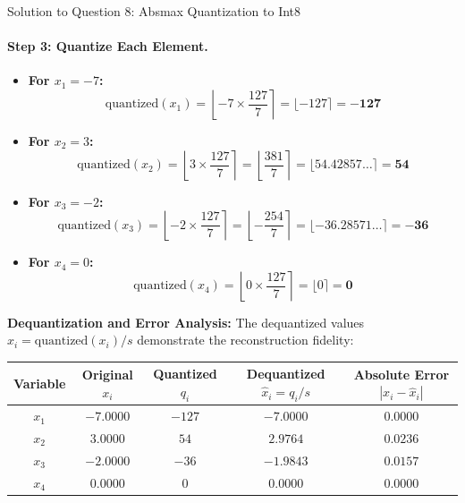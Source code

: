 \documentclass[11pt,a4paper]{article}
\begin{document}
\begin{solutionbox}{Solution to Question 8: Absmax Quantization to Int8}
\paragraph{Step 3: Quantize Each Element.}
\begin{itemize}[leftmargin=2em]
    \item \textbf{For $x_1 = -7$:}
    \begin{equation}
        \text{quantized}(x_1) = \left\lfloor -7 \times \frac{127}{7} \right\rceil = \lfloor -127 \rceil = \mathbf{-127}
    \end{equation}
    \item \textbf{For $x_2 = 3$:}
    \begin{equation}
        \text{quantized}(x_2) = \left\lfloor 3 \times \frac{127}{7} \right\rceil = \left\lfloor \frac{381}{7} \right\rceil = \lfloor 54.42857 \dots \rceil = \mathbf{54}
    \end{equation}
    \item \textbf{For $x_3 = -2$:}
    \begin{equation}
        \text{quantized}(x_3) = \left\lfloor -2 \times \frac{127}{7} \right\rceil = \left\lfloor -\frac{254}{7} \right\rceil = \lfloor -36.28571 \dots \rceil = \mathbf{-36}
    \end{equation}
    \item \textbf{For $x_4 = 0$:}
    \begin{equation}
        \text{quantized}(x_4) = \left\lfloor 0 \times \frac{127}{7} \right\rceil = \lfloor 0 \rceil = \mathbf{0}
    \end{equation}
\end{itemize}

\medskip
\textbf{Dequantization and Error Analysis:}
The dequantized values $\hat{x}_i = \text{quantized}(x_i) / s$ demonstrate the reconstruction fidelity:
\begin{center}
\small
\begin{tabular}{ccccc}
\toprule
\textbf{Variable} & \textbf{Original $x_i$} & \textbf{Quantized $q_i$} & \textbf{Dequantized $\hat{x}_i = q_i / s$} & \textbf{Absolute Error $|x_i - \hat{x}_i|$} \\
\midrule
$x_1$ & $-7.0000$ & $-127$ & $-7.0000$ & $0.0000$ \\
$x_2$ & $3.0000$ & $54$ & $2.9764$ & $0.0236$ \\
$x_3$ & $-2.0000$ & $-36$ & $-1.9843$ & $0.0157$ \\
$x_4$ & $0.0000$ & $0$ & $0.0000$ & $0.0000$ \\
\bottomrule
\end{tabular}
\end{center}
\end{solutionbox}
\end{document}
